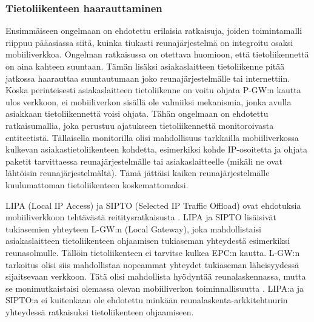 \subsubsection*{Tietoliikenteen haarauttaminen}
Ensimmäiseen ongelmaan on ehdotettu erilaisia ratkaisuja, joiden toimintamalli riippuu pääasiassa siitä, kuinka tiukasti reunajärjestelmä on integroitu osaksi mobiiliverkkoa.
Ongelman ratkaisussa on otettava huomioon, että tietoliikennettä on aina kahteen suuntaan. Tämän lisäksi asiakaslaitteen tietoliikenne pitää jatkossa haarauttaa suuntautumaan joko reunajärjestelmälle tai internettiin. 
Koska perinteisesti asiakaslaitteen tietoliikenne on voitu ohjata P-GW:n kautta ulos verkkoon, ei mobiiliverkon sisällä ole valmiiksi mekanismia, jonka avulla asiakkaan tietoliikennettä voisi ohjata.
Tähän ongelmaan on ehdotettu ratkaisumallia, joka perustuu ajatukseen tietoliikennettä monitoroivasta entiteetistä.
Tällaisella monitorilla olisi mahdollisuus tarkkailla mobiiliverkossa kulkevan asiakastietoliikenteen kohdetta, esimerkiksi kohde IP-osoitetta ja ohjata paketit tarvittaessa reunajärjestelmälle tai asiakaslaitteelle (mikäli ne ovat lähtöisin reunajärjestelmältä).
Tämä jättäisi kaiken reunajärjestelmälle kuulumattoman tietoliikenteen koskemattomaksi.

LIPA (Local IP Access) ja SIPTO (Selected IP Traffic Offload) ovat ehdotuksia mobiiliverkkoon tehtävästä reititysratkaisusta \cite{samdanis2012traffic}.
LIPA ja SIPTO lisäisivät tukiasemien yhteyteen L-GW:n (Local Gateway), joka mahdollistaisi asiakaslaitteen tietoliikenteen ohjaamisen tukiaseman yhteydestä esimerkiksi reunasolmulle. 
Tällöin tietoliikenteen ei tarvitse kulkea EPC:n kautta. 
L-GW:n tarkoitus olisi siis mahdollistaa nopeammat yhteydet tukiaseman läheisyydessä sijaitsevaan verkkoon. Tätä olisi mahdollista hyödyntää reunalaskennassa, mutta se monimutkaistaisi olemassa olevan mobiiliverkon toiminnallisuutta \cite{cho2014smore}.
LIPA:a ja SIPTO:a ei kuitenkaan ole ehdotettu minkään reunalaskenta-arkkitehtuurin yhteydessä ratkaisuksi tietoliikenteen ohjaamiseen. 

